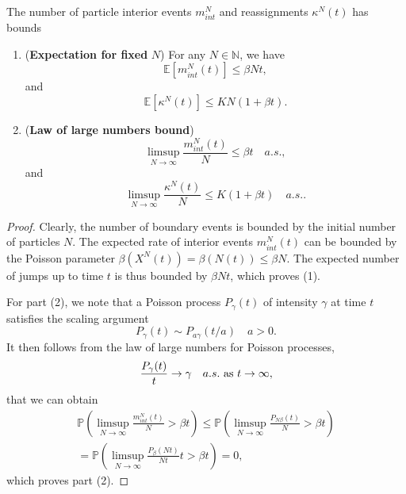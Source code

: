 \begin{lem}\label{jumpbound}  The number of particle interior events $m_{int}^N$ and  reassignments $\kappa^N(t)$ has bounds
\begin{enumerate}
\item (\textbf{Expectation for fixed} $N$) For any $N \in \mathbb N$, we have 
\begin{equation}
\mathbb{E} [m^N_{int}(t)]\le \beta Nt,
\end{equation}  and
\begin{equation}
\mathbb{E} [\kappa^N(t)]\le KN(1+\beta t).
\end{equation}

\item 
(\textbf{Law of large numbers bound})  
\begin{equation}
\limsup_{N\rightarrow \infty} \frac{m^N_{int}(t)}{N}\le \beta t    \quad a.s., 
\end{equation} 
and
\begin{equation}
\limsup_{N\rightarrow \infty} \frac{\kappa^N(t)}{N}\le K(1+\beta t)    \quad a.s.. 
\end{equation}


\end{enumerate}  
\end{lem}
\begin{proof} Clearly, the number of boundary events is bounded by the initial number of particles $N$.   The expected rate of interior events $m_{int}^N(t)$ can be bounded by the Poisson parameter $\beta(X^N(t)) = \beta (N(t))\le \beta N$.    The expected number of jumps up to time $t$ is thus bounded by $\beta Nt$, which proves (1).  

For part (2), we note that a Poisson process $P_\gamma(t)$ of intensity $\gamma$ at time $t$ satisfies the scaling argument
\begin{equation}
P_\gamma(t) \sim P_{a\gamma}(t/a) \quad a>0.
\end{equation}
It then follows  from the law of large numbers for Poisson processes,
\begin{equation}
\frac{P_\gamma(t)}{t} \rightarrow \gamma \quad a.s. \hbox{ as } t \rightarrow \infty,
\end{equation}
 that we can obtain  
\begin{eqnarray} 
\mathbb P(\limsup_{N \rightarrow \infty}\frac{m_{int}^N(t)}{N}>\beta t) \le \mathbb{P}\left(\limsup_{N \rightarrow \infty}\frac{P_{N\beta}(t)}{N} >\beta t\right)\\
= \mathbb{P}\left(\limsup_{N \rightarrow \infty}\frac{P_{\beta}(Nt)}{Nt}t > \beta t\right) = 0, \nonumber \end{eqnarray}    
which proves part (2).   
\end{proof}

